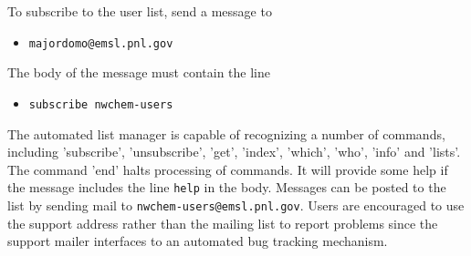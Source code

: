 To subscribe to the user list, send a message to 

\begin{itemize}
\item {\tt majordomo@emsl.pnl.gov}
\end{itemize}

The body of the message must contain the line 

\begin{itemize}
\item {\tt subscribe nwchem-users}
\end{itemize}

The automated list manager is capable of recognizing a number of
commands, including 'subscribe', 'unsubscribe', 'get', 'index',
'which', 'who', 'info' and 'lists'.  The command 'end' halts
processing of commands.  It will provide some help if the message
includes the line {\tt help} in the body.  Messages can be posted to
the list by sending mail to {\tt nwchem-users@emsl.pnl.gov}.  Users
are encouraged to use the support address rather than the mailing list
to report problems since the support mailer interfaces to an automated
bug tracking mechanism.


